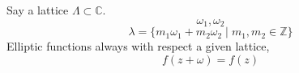 \documentclass[letter]{article}
\title{}
\author{Ahmed Saad Sabit, Rice University}
\date{\today}
\begin{document}
\maketitle
Say a lattice $\Lambda \subset \mathbb{C}$. 
\[
\omega_1, \omega_2
\] 
\[
\lambda = \{m_1 \omega_1 + m_2 \omega_2  \mid m_1, m_2 \in \mathbb{Z}\} 
\]
Elliptic functions always with respect a given lattice, 
\[
f(z+ \omega) = f(z)
\] 
\end{document}
